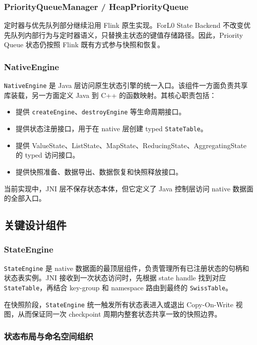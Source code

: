 \documentclass[a4paper,11pt]{article}
\newcommand{\project}{ForL0 State Backend}
\begin{document}
\subsubsection{PriorityQueueManager / HeapPriorityQueue}

定时器与优先队列部分继续沿用 Flink 原生实现。\project{} 不改变优先队列内部行为与定时器语义，只替换主状态的键值存储路径。因此，Priority Queue 状态仍按照 Flink 既有方式参与快照和恢复。

\subsubsection{NativeEngine}

\texttt{NativeEngine} 是 Java 层访问原生状态引擎的统一入口。该组件一方面负责共享库装载，另一方面定义 Java 到 C++ 的函数映射。其核心职责包括：

\begin{itemize}
  \item 提供 \texttt{createEngine}、\texttt{destroyEngine} 等生命周期接口。
  \item 提供状态注册接口，用于在 native 层创建 typed \texttt{StateTable}。
  \item 提供 ValueState、ListState、MapState、ReducingState、AggregatingState 的 typed 访问接口。
  \item 提供快照准备、数据导出、数据恢复和快照释放接口。
\end{itemize}

当前实现中，JNI 层不保存状态本体，但它定义了 Java 控制层访问 native 数据面的全部入口。

\subsection{关键设计组件}

\subsubsection{StateEngine}

\texttt{StateEngine} 是 native 数据面的最顶层组件，负责管理所有已注册状态的句柄和状态表实例。JNI 接收到一次状态访问时，先根据 state handle 找到对应 \texttt{StateTable}，再结合 key-group 和 namespace 路由到最终的 \texttt{SwissTable}。

在快照阶段，\texttt{StateEngine} 统一触发所有状态表进入或退出 Copy-On-Write 视图，从而保证同一次 checkpoint 周期内整套状态共享一致的快照边界。

\subsubsection{状态布局与命名空间组织}
\end{document}
